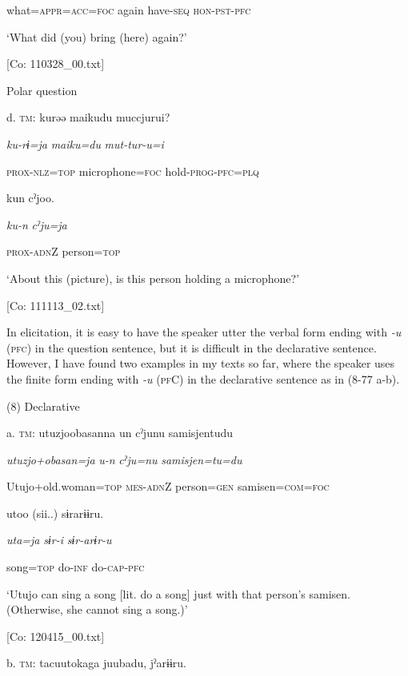       what=\textsc{appr}=\textsc{acc}=\textsc{foc}  again  have-\textsc{seq}  \textsc{hon}-\textsc{pst}-\textsc{pfc}

      ‘What did (you) bring (here) again?’

      [Co: 110328\_00.txt]

  Polar question

  d.  \textsc{tm}:  kurəə  {\textbar}maiku{\textbar}du  muccjurui?

      \textit{ku-rɨ=ja}  \textit{maiku=du}  \textit{mut-tur-u=i}

      \textsc{prox}-\textsc{nlz}=\textsc{top}  microphone=\textsc{foc}  hold-\textsc{prog}-\textsc{pfc}=\textsc{plq}

      kun  cˀjoo.  

      \textit{ku-n}  \textit{cˀju=ja}  

      \textsc{prox}-\textsc{adn}Z  person=\textsc{top}

      ‘About this (picture), is this person holding a microphone?’

      [Co: 111113\_02.txt]

In elicitation, it is easy to have the speaker utter the verbal form ending with \textit{{}-u} (\textsc{pfc}) in the question sentence, but it is difficult in the declarative sentence. However, I have found two examples in my texts so far, where the speaker uses the finite form ending with \textit{{}-u} (\textsc{pf}C) in the declarative sentence as in (8-77 a-b).

(8)  Declarative

  a.  \textsc{tm}:  utuzjoobasanna  un  cˀjunu  samisjentudu

      \textit{utuzjo+obasan=ja}  \textit{u-n}  \textit{cˀju=nu}  \textit{samisjen=tu=du}

      Utujo+old.woman=\textsc{top}  \textsc{mes}-\textsc{adn}Z  person=\textsc{gen}  samisen=\textsc{com}=\textsc{foc}

      utoo  (sii..)  sɨrarɨɨru.  

      \textit{uta=ja}  \textit{sɨr-i}  \textit{sɨr-arɨr-u}  

      song=\textsc{top}  do-\textsc{inf}  do-\textsc{cap}-\textsc{pfc}

      ‘Utujo can sing a song [lit. do a song] just with that person’s samisen. (Otherwise, she cannot sing a song.)’

      [Co: 120415\_00.txt]

  b.  \textsc{tm}:  tacuu{\textbar}toka{\textbar}ga  juubadu,  jˀarɨɨru.

